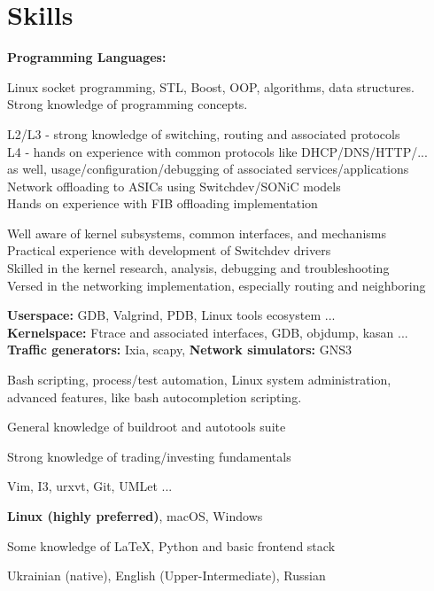 \documentclass{article}
\begin{document}
\section{Skills}
\textbf{Programming Languages:}
\begin{description}[align=left,leftmargin=3.8cm,style=multiline]
\item[C/C++] Linux socket programming, STL, Boost, OOP, algorithms, data structures.\\
             Strong knowledge of programming concepts.
\item[Networking] L2/L3 - strong knowledge of switching, routing and associated protocols \\
                  L4 - hands on experience with common protocols like DHCP/DNS/HTTP/... \\
                  as well, usage/configuration/debugging of associated services/applications\\
                  Network offloading to ASICs using Switchdev/SONiC models\\
                  Hands on experience with FIB offloading implementation 
\item[Linux Kernel] Well aware of kernel subsystems, common interfaces, and mechanisms \\
                    Practical experience with development of Switchdev drivers \\
                    Skilled in the kernel research, analysis, debugging and troubleshooting  \\
                    Versed in the networking implementation, especially routing and neighboring
\item[Debugging \&\\ Network Virtualization]
        {\bfseries Userspace:} GDB, Valgrind, PDB, Linux tools ecosystem ...\\
        {\bfseries Kernelspace:} Ftrace and associated interfaces, GDB, objdump, kasan ... \\
        {\bfseries Traffic generators:} Ixia, scapy, {\bfseries Network simulators:} GNS3
\item[Scripting] Bash scripting, process/test automation, Linux system administration,\\
                 advanced features, like bash autocompletion scripting.
\item[Build Systems]        General knowledge of buildroot and autotools suite 
\item[Fintech]              Strong knowledge of trading/investing fundamentals
\item[Development Tools]    Vim, I3, urxvt, Git, UMLet ...
\item[Operating System]     {\bfseries Linux (highly preferred)}, macOS, Windows
\item[General]              Some knowledge of \LaTeX, Python and basic frontend stack
\item[Languages]            Ukrainian (native), English (Upper-Intermediate), Russian\\
\end{description}
\end{document}
